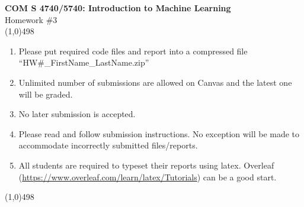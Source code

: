 \documentclass[11pt]{article}
\begin{document}
\begin{center}
{\Large \textbf{COM S 4740/5740: Introduction to Machine Learning}\\Homework \#3}\\

\linethickness{1mm}\line(1,0){498}

\begin{enumerate}
\item Please put required code files and report into a
compressed file ``HW\#\_FirstName\_LastName.zip''
\item Unlimited number of submissions are
allowed on Canvas and the latest one will be graded.
\item {\color{red} No later submission is accepted.}
\item Please read and follow submission instructions. No exception
will be made to accommodate incorrectly submitted files/reports.
\item All students are required to typeset their reports using
latex. Overleaf
(\url{https://www.overleaf.com/learn/latex/Tutorials}) can be a
good start.
\end{enumerate}

\linethickness{1mm}\line(1,0){498}

\end{center}


\end{document}
